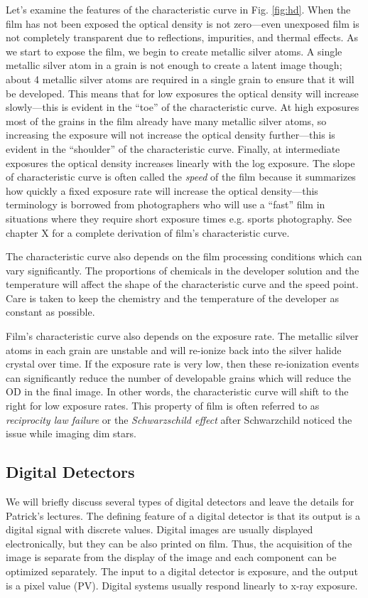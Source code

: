 \documentclass[mphy386-notes.tex]{subfiles}
\begin{document}
Let's examine the features of the characteristic curve in Fig. \ref{fig:hd}.
When the film has not been exposed the optical density is not zero---even
unexposed film is not completely transparent due to reflections, impurities, and
thermal effects. As we start to expose the film, we begin to create metallic
silver atoms. A single metallic silver atom in a grain is not enough to create a
latent image though; about 4 metallic silver atoms are required in a single
grain to ensure that it will be developed. This means that for low exposures the
optical density will increase slowly---this is evident in the ``toe'' of the
characteristic curve. At high exposures most of the grains in the film already
have many metallic silver atoms, so increasing the exposure will not increase
the optical density further---this is evident in the ``shoulder'' of the
characteristic curve. Finally, at intermediate exposures the optical density
increases linearly with the log exposure. The slope of characteristic curve is
often called the \textit{speed} of the film because it summarizes how quickly a
fixed exposure rate will increase the optical density---this terminology is
borrowed from photographers who will use a ``fast'' film in situations where
they require short exposure times e.g. sports photography. See \cite{barrett}
chapter X for a complete derivation of film's characteristic curve.

The characteristic curve also depends on the film processing conditions which
can vary significantly. The proportions of chemicals in the developer solution
and the temperature will affect the shape of the characteristic curve and the
speed point. Care is taken to keep the chemistry and the temperature of the
developer as constant as possible.

Film's characteristic curve also depends on the exposure rate. The metallic
silver atoms in each grain are unstable and will re-ionize back into the silver
halide crystal over time. If the exposure rate is very low, then these
re-ionization events can significantly reduce the number of developable grains
which will reduce the OD in the final image. In other words, the characteristic
curve will shift to the right for low exposure rates. This property of film is
often referred to as \textit{reciprocity law failure} or the
\textit{Schwarzschild effect} after Schwarzchild noticed the issue while imaging
dim stars.

\subsection{Digital Detectors}
We will briefly discuss several types of digital detectors and leave the details
for Patrick's lectures. The defining feature of a digital detector is that its
output is a digital signal with discrete values. Digital images are usually
displayed electronically, but they can be also printed on film. Thus, the
acquisition of the image is separate from the display of the image and each
component can be optimized separately. The input to a digital detector is
exposure, and the output is a pixel value (PV). Digital systems usually respond
linearly to x-ray exposure.
\end{document}
